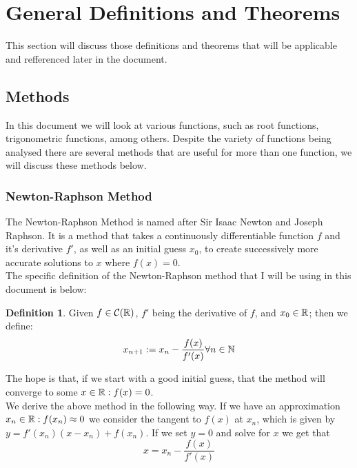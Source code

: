 \section{General Definitions and Theorems}
\label{SEC_"General Definitions and Theorems"}
This section will discuss those definitions and theorems that will be applicable and refferenced later in the document.

\subsection{Methods}

In this document we will look at various functions, such as root functions, trigonometric functions, among others. Despite the variety of functions being analysed there are several methods that are useful for more than one function, we will discuss these methods below.

\subsubsection{Newton-Raphson Method}
\label{SUBSUB_"Newton-Raphson Method"}
\theoremstyle{definition}
\newtheorem{Newton Method}{Definition}[subsubsection]

The Newton-Raphson Method is named after Sir Isaac Newton and Joseph Raphson. It is a method that takes a continuously differentiable function \(f\) and it's derivative \(f'\), as well as an initial guess \(x_0\), to create successively more accurate solutions to \(x\) where \(f(x) = 0\).\\

The specific definition of the Newton-Raphson method that I will be using in this document is below:

\begin{Newton Method}
\label{DEF_"Newton-Raphson Method"}
Given \(f \in \mathcal{C}(\mathbb{R})\), \(f'\) being the derivative of \(f\), and \(x_0 \in \mathbb{R}\); then we define:
\begin{displaymath}
	x_{n+1} := x_n - \frac{f(x)}{f'(x)} \forall n \in \mathbb{N}
\end{displaymath}
\end{Newton Method}

The hope is that, if we start with a good initial guess, that the method will converge to some \(x \in \mathbb{R} : f(x) = 0\).\\

We derive the above method in the following way. If we have an approximation \(x_n \in \mathbb{R} : f(x_n) \approx 0\) we consider the tangent to \(f(x)\) at \(x_n\), which is given by \(y = f'(x_n)(x-x_n) + f(x_n)\). If we set \(y = 0\) and solve for \(x\) we get that \[x = x_n - \frac{f(x)}{f'(x)}\]

